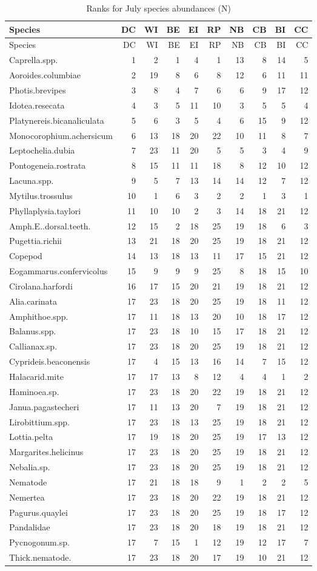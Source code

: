 \documentclass[]{article}
\begin{document}
\begin{longtable}[]{@{}lrrrrrrrrr@{}}
\caption{Ranks for July species abundances (N)}\tabularnewline
\toprule
Species & DC & WI & BE & EI & RP & NB & CB & BI & CC\tabularnewline
\midrule
\endfirsthead
\toprule
Species & DC & WI & BE & EI & RP & NB & CB & BI & CC\tabularnewline
\midrule
\endhead
Caprella.spp. & 1 & 2 & 1 & 4 & 1 & 13 & 8 & 14 & 5\tabularnewline
Aoroides.columbiae & 2 & 19 & 8 & 6 & 8 & 12 & 6 & 11 &
11\tabularnewline
Photis.brevipes & 3 & 8 & 4 & 7 & 6 & 6 & 9 & 17 & 12\tabularnewline
Idotea.resecata & 4 & 3 & 5 & 11 & 10 & 3 & 5 & 5 & 4\tabularnewline
Platynereis.bicanaliculata & 5 & 6 & 3 & 5 & 4 & 6 & 15 & 9 &
12\tabularnewline
Monocorophium.achersicum & 6 & 13 & 18 & 20 & 22 & 10 & 11 & 8 &
7\tabularnewline
Leptochelia.dubia & 7 & 23 & 11 & 20 & 5 & 5 & 3 & 4 & 9\tabularnewline
Pontogeneia.rostrata & 8 & 15 & 11 & 11 & 18 & 8 & 12 & 10 &
12\tabularnewline
Lacuna.spp. & 9 & 5 & 7 & 13 & 14 & 14 & 12 & 7 & 12\tabularnewline
Mytilus.trossulus & 10 & 1 & 6 & 3 & 2 & 2 & 1 & 3 & 1\tabularnewline
Phyllaplysia.taylori & 11 & 10 & 10 & 2 & 3 & 14 & 18 & 21 &
12\tabularnewline
Amph.E..dorsal.teeth. & 12 & 15 & 2 & 18 & 25 & 19 & 18 & 6 &
3\tabularnewline
Pugettia.richii & 13 & 21 & 18 & 20 & 25 & 19 & 18 & 21 &
12\tabularnewline
Copepod & 14 & 13 & 18 & 13 & 11 & 17 & 15 & 21 & 12\tabularnewline
Eogammarus.confervicolus & 15 & 9 & 9 & 9 & 25 & 8 & 18 & 15 &
10\tabularnewline
Cirolana.harfordi & 16 & 17 & 15 & 20 & 21 & 19 & 18 & 21 &
12\tabularnewline
Alia.carinata & 17 & 23 & 18 & 20 & 25 & 19 & 18 & 11 &
12\tabularnewline
Amphithoe.spp. & 17 & 11 & 18 & 13 & 20 & 10 & 18 & 17 &
12\tabularnewline
Balanus.spp. & 17 & 23 & 18 & 10 & 15 & 17 & 18 & 21 & 12\tabularnewline
Callianax.sp. & 17 & 23 & 18 & 20 & 25 & 19 & 18 & 21 &
12\tabularnewline
Cyprideis.beaconensis & 17 & 4 & 15 & 13 & 16 & 14 & 7 & 15 &
12\tabularnewline
Halacarid.mite & 17 & 17 & 13 & 8 & 12 & 4 & 4 & 1 & 2\tabularnewline
Haminoea.sp. & 17 & 23 & 18 & 20 & 22 & 19 & 18 & 21 & 12\tabularnewline
Janua.pagastecheri & 17 & 11 & 13 & 20 & 7 & 19 & 18 & 21 &
12\tabularnewline
Lirobittium.spp. & 17 & 23 & 18 & 13 & 25 & 19 & 18 & 21 &
12\tabularnewline
Lottia.pelta & 17 & 19 & 18 & 20 & 25 & 19 & 17 & 13 & 12\tabularnewline
Margarites.helicinus & 17 & 23 & 18 & 20 & 25 & 19 & 18 & 21 &
12\tabularnewline
Nebalia.sp. & 17 & 23 & 18 & 20 & 25 & 19 & 18 & 21 & 12\tabularnewline
Nematode & 17 & 21 & 18 & 18 & 9 & 1 & 2 & 2 & 5\tabularnewline
Nemertea & 17 & 23 & 18 & 20 & 22 & 19 & 18 & 21 & 12\tabularnewline
Pagurus.quaylei & 17 & 23 & 18 & 20 & 25 & 19 & 18 & 17 &
12\tabularnewline
Pandalidae & 17 & 23 & 18 & 20 & 18 & 19 & 18 & 21 & 12\tabularnewline
Pycnogonum.sp. & 17 & 7 & 15 & 1 & 12 & 19 & 12 & 17 & 7\tabularnewline
Thick.nematode. & 17 & 23 & 18 & 20 & 17 & 19 & 10 & 21 &
12\tabularnewline
\bottomrule
\end{longtable}
\end{document}
